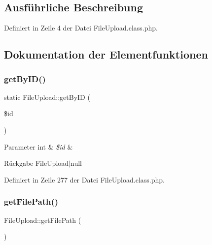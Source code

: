 \subsection{Ausführliche Beschreibung}


Definiert in Zeile 4 der Datei File\+Upload.\+class.\+php.



\subsection{Dokumentation der Elementfunktionen}
\mbox{\label{class_file_upload_ad043afa95b3bf28d82b0b871ae56ca4a}} 
\subsubsection{\texorpdfstring{get\+By\+I\+D()}{getByID()}}
{\footnotesize\ttfamily static File\+Upload\+::get\+By\+ID (\begin{DoxyParamCaption}\item[{}]{\$id }\end{DoxyParamCaption})\hspace{0.3cm}{\ttfamily [static]}}


\begin{DoxyParams}[1]{Parameter}
int & {\em \$id} & \\
\hline
\end{DoxyParams}
\begin{DoxyReturn}{Rückgabe}
File\+Upload$\vert$null 
\end{DoxyReturn}


Definiert in Zeile 277 der Datei File\+Upload.\+class.\+php.

\mbox{\label{class_file_upload_a12fffe7962e60e59daab147c0e34efc6}} 
\subsubsection{\texorpdfstring{get\+File\+Path()}{getFilePath()}}
{\footnotesize\ttfamily File\+Upload\+::get\+File\+Path (\begin{DoxyParamCaption}{ }\end{DoxyParamCaption})}

